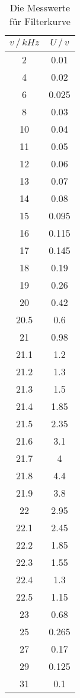 \begin{table}[H]
    \centering
    \caption{Die Messwerte für Filterkurve}
    \label{tab:filterkurve}
\begin{tabular}{c c}
    \toprule
          $v \, /\,\si{kHz}$ & $U \,/\,\si{v}$ \\
    \midrule
           2 &    0.01 \\
           4 &    0.02 \\
           6 &   0.025 \\
           8 &    0.03 \\
          10 &    0.04 \\
          11 &    0.05 \\
          12 &    0.06 \\
          13 &    0.07 \\
          14 &    0.08 \\
          15 &   0.095 \\
          16 &   0.115 \\
          17 &   0.145 \\
          18 &    0.19 \\
          19 &    0.26 \\
          20 &    0.42 \\
        20.5 &     0.6 \\
          21 &    0.98 \\
        21.1 &     1.2 \\
        21.2 &     1.3 \\
        21.3 &     1.5 \\
        21.4 &    1.85 \\
        21.5 &    2.35 \\
        21.6 &     3.1 \\
        21.7 &       4 \\
        21.8 &     4.4 \\
        21.9 &     3.8 \\
          22 &    2.95 \\
        22.1 &    2.45 \\
        22.2 &    1.85 \\
        22.3 &    1.55 \\
        22.4 &     1.3 \\
        22.5 &    1.15 \\
          23 &    0.68 \\
          25 &   0.265 \\
          27 &    0.17 \\
          29 &   0.125 \\
          31 &    0.1 \\
    \bottomrule
    \end{tabular}
\end{table}

